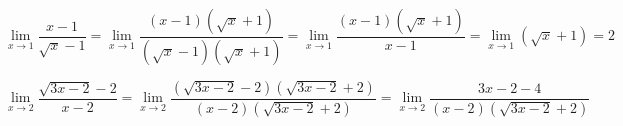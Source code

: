 \begin{alist}
\item \[\lim_{x\to 1}\frac{x-1}{\sqrt{x}-1}=\lim_{x\to 1}\frac{(x-1)\left(\sqrt{x}+1\right)}{\left(\sqrt{x}-1\right)\left(\sqrt{x}+1\right)}=\lim_{x\to 1}\frac{(x-1)\left(\sqrt{x}+1\right)}{x-1}=\lim_{x\to 1}\left(\sqrt{x}+1\right)=2 \]
\item \[ \lim_{x\to 2}\frac{\sqrt{3x-2}-2}{x-2}=\lim_{x\to 2}{\frac{\left(\sqrt{3x-2}-2\right)\left(\sqrt{3x-2}+2\right)}{(x-2)\left(\sqrt{3x-2}+2\right)}}=\lim_{x\to 2}\frac{3x-2-4}{(x-2)\left(\sqrt{3x-2}+2\right)} \]
\end{alist}
